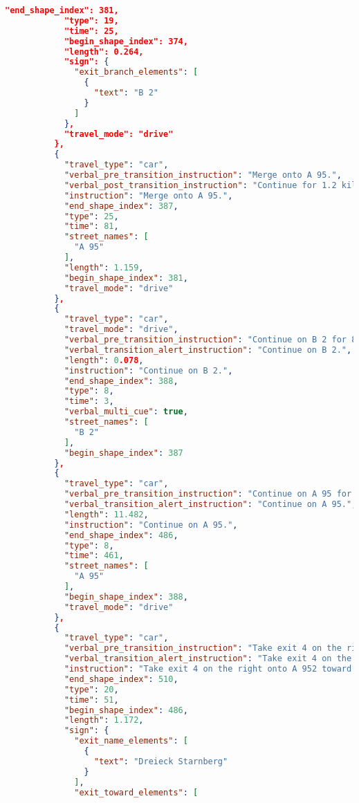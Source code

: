 \begin{lstlisting}[language=json,breaklines=true]
            "end_shape_index": 381,
            "type": 19,
            "time": 25,
            "begin_shape_index": 374,
            "length": 0.264,
            "sign": {
              "exit_branch_elements": [
                {
                  "text": "B 2"
                }
              ]
            },
            "travel_mode": "drive"
          },
          {
            "travel_type": "car",
            "verbal_pre_transition_instruction": "Merge onto A 95.",
            "verbal_post_transition_instruction": "Continue for 1.2 kilometers.",
            "instruction": "Merge onto A 95.",
            "end_shape_index": 387,
            "type": 25,
            "time": 81,
            "street_names": [
              "A 95"
            ],
            "length": 1.159,
            "begin_shape_index": 381,
            "travel_mode": "drive"
          },
          {
            "travel_type": "car",
            "travel_mode": "drive",
            "verbal_pre_transition_instruction": "Continue on B 2 for 80 meters. Then Continue on A 95.",
            "verbal_transition_alert_instruction": "Continue on B 2.",
            "length": 0.078,
            "instruction": "Continue on B 2.",
            "end_shape_index": 388,
            "type": 8,
            "time": 3,
            "verbal_multi_cue": true,
            "street_names": [
              "B 2"
            ],
            "begin_shape_index": 387
          },
          {
            "travel_type": "car",
            "verbal_pre_transition_instruction": "Continue on A 95 for 11.5 kilometers.",
            "verbal_transition_alert_instruction": "Continue on A 95.",
            "length": 11.482,
            "instruction": "Continue on A 95.",
            "end_shape_index": 486,
            "type": 8,
            "time": 461,
            "street_names": [
              "A 95"
            ],
            "begin_shape_index": 388,
            "travel_mode": "drive"
          },
          {
            "travel_type": "car",
            "verbal_pre_transition_instruction": "Take exit 4 on the right onto A 9 52 toward Starnberg.",
            "verbal_transition_alert_instruction": "Take exit 4 on the right.",
            "instruction": "Take exit 4 on the right onto A 952 toward Starnberg.",
            "end_shape_index": 510,
            "type": 20,
            "time": 51,
            "begin_shape_index": 486,
            "length": 1.172,
            "sign": {
              "exit_name_elements": [
                {
                  "text": "Dreieck Starnberg"
                }
              ],
              "exit_toward_elements": [

\end{lstlisting}
